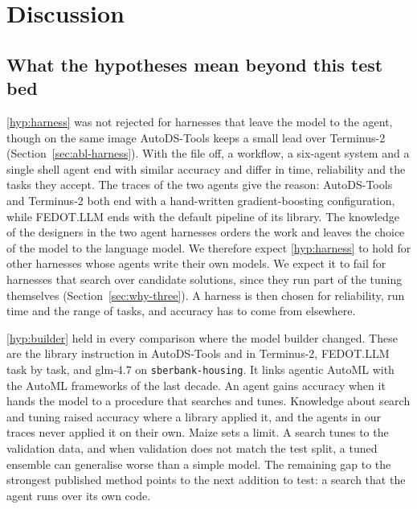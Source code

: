 \section{Discussion}
\label{sec:discussion}



\subsection{What the hypotheses mean beyond this test bed}
\label{sec:beyond}

\ref{hyp:harness} was not rejected for harnesses that leave the model to
the agent, though on the same image AutoDS-Tools keeps a small lead over
Terminus-2 (Section~\ref{sec:abl-harness}). With the file off, a workflow, a
six-agent system and a single shell agent end with similar accuracy and
differ in time, reliability and the tasks they accept. The traces of the two
agents give the reason: AutoDS-Tools and Terminus-2 both end with a
hand-written gradient-boosting configuration, while FEDOT.LLM ends with the
default pipeline of its library. The knowledge of the designers in the two
agent harnesses orders the work and leaves the choice of the model to the
language model. We therefore expect
\ref{hyp:harness} to hold for other harnesses whose agents write their own
models. We expect it to fail for harnesses that search over candidate
solutions, since they run part of the tuning themselves
(Section~\ref{sec:why-three}). A harness is then chosen for reliability,
run time and the range of tasks, and accuracy has to come from elsewhere.

\ref{hyp:builder} held in every comparison where the model builder changed.
These are the library instruction in AutoDS-Tools and in Terminus-2,
FEDOT.LLM task by task, and glm-4.7 on \texttt{sberbank-housing}. It links agentic AutoML with
the AutoML frameworks of the last decade. An agent gains accuracy when it
hands the model to a procedure that searches and tunes. Knowledge about
search and tuning raised accuracy where a library applied it, and the agents
in our traces never applied it on their own. Maize sets a limit. A
search tunes to the validation data, and when validation does not match the
test split, a tuned ensemble can generalise worse than a simple model. The
remaining gap to the strongest published method points to the next addition
to test: a search that the agent runs over its own code.

